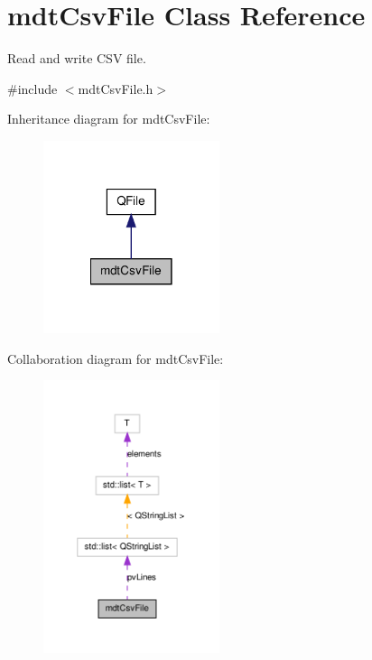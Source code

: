 \hypertarget{classmdt_csv_file}{\section{mdt\-Csv\-File Class Reference}
\label{classmdt_csv_file}
}


Read and write C\-S\-V file.  




{\ttfamily \#include $<$mdt\-Csv\-File.\-h$>$}



Inheritance diagram for mdt\-Csv\-File\-:\nopagebreak
\begin{figure}[H]
\begin{center}
\leavevmode
\includegraphics[width=146pt]{classmdt_csv_file__inherit__graph}
\end{center}
\end{figure}


Collaboration diagram for mdt\-Csv\-File\-:\nopagebreak
\begin{figure}[H]
\begin{center}
\leavevmode
\includegraphics[width=146pt]{classmdt_csv_file__coll__graph}
\end{center}
\end{figure}
